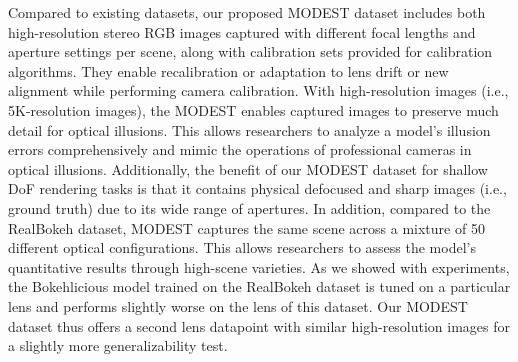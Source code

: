 Compared to existing datasets, our proposed MODEST dataset includes both high-resolution stereo RGB images captured with different focal lengths and aperture settings per scene, along with calibration sets provided for calibration algorithms. They enable recalibration or adaptation to lens drift or new alignment while performing camera calibration. With high-resolution images (i.e., 5K-resolution images), the MODEST enables captured images to preserve much detail for optical illusions. This allows researchers to analyze a model’s illusion errors comprehensively and mimic the operations of professional cameras in optical illusions. Additionally, the benefit of our MODEST dataset for shallow DoF rendering tasks is that it contains physical defocused and sharp images (i.e., ground truth) due to its wide range of apertures. In addition, compared to the RealBokeh dataset, MODEST captures the same scene across a mixture of 50 different optical configurations. This allows researchers to assess the model’s quantitative results through high-scene varieties. As we showed with experiments, the Bokehlicious model trained on the RealBokeh dataset is tuned on a particular lens and performs slightly worse on the lens of this dataset. Our MODEST dataset thus offers a second lens datapoint with similar high-resolution images for a slightly more generalizability test.




